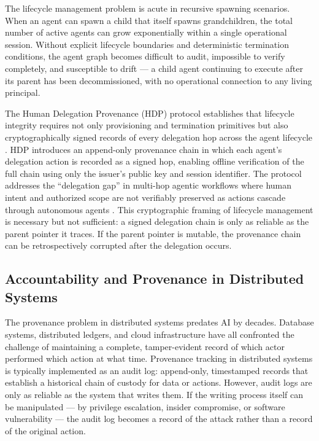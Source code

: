 The lifecycle management problem is acute in recursive spawning scenarios. When an agent can spawn a child that itself spawns grandchildren, the total number of active agents can grow exponentially within a single operational session. Without explicit lifecycle boundaries and deterministic termination conditions, the agent graph becomes difficult to audit, impossible to verify completely, and susceptible to drift --- a child agent continuing to execute after its parent has been decommissioned, with no operational connection to any living principal.

The Human Delegation Provenance (HDP) protocol establishes that lifecycle integrity requires not only provisioning and termination primitives but also cryptographically signed records of every delegation hop across the agent lifecycle \cite{hdp2026,helixar2026}. HDP introduces an append-only provenance chain in which each agent's delegation action is recorded as a signed hop, enabling offline verification of the full chain using only the issuer's public key and session identifier. The protocol addresses the ``delegation gap'' in multi-hop agentic workflows where human intent and authorized scope are not verifiably preserved as actions cascade through autonomous agents \cite{arxiv2604.04522}. This cryptographic framing of lifecycle management is necessary but not sufficient: a signed delegation chain is only as reliable as the parent pointer it traces. If the parent pointer is mutable, the provenance chain can be retrospectively corrupted after the delegation occurs.

\subsection{Accountability and Provenance in Distributed Systems}
\label{sec:accountability-provenance}

The provenance problem in distributed systems predates AI by decades. Database systems, distributed ledgers, and cloud infrastructure have all confronted the challenge of maintaining a complete, tamper-evident record of which actor performed which action at what time. Provenance tracking in distributed systems is typically implemented as an audit log: append-only, timestamped records that establish a historical chain of custody for data or actions. However, audit logs are only as reliable as the system that writes them. If the writing process itself can be manipulated --- by privilege escalation, insider compromise, or software vulnerability --- the audit log becomes a record of the attack rather than a record of the original action.

